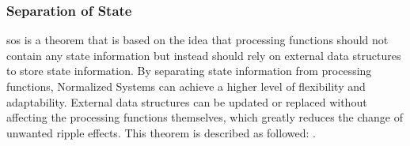 \subsubsection*{Separation of State}

\gls{sos} is a theorem that is based on the idea that processing functions should not
contain any state information but instead should rely on external data structures to store
state information. By separating state information from processing functions, Normalized
Systems can achieve a higher level of flexibility and adaptability. External data
structures can be updated or replaced without affecting the processing functions
themselves, which greatly reduces the change of unwanted ripple effects. This theorem is
described as followed: \parencite[258]{mannaert_normalized_2016}.

